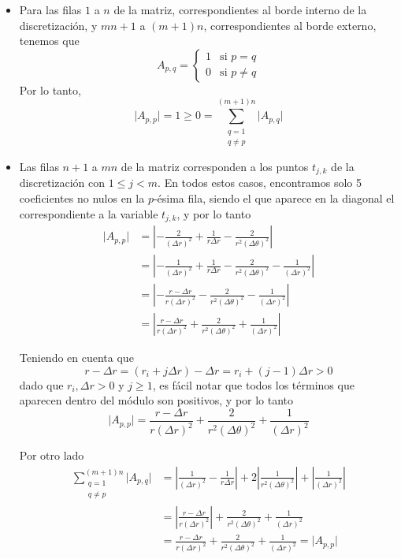 \documentclass[11pt, a4paper, spanish]{article}
\theoremstyle{plain}
\theoremstyle{remark}
\begin{document}
      \begin{itemize}

        \item Para las filas $1$ a $n$ de la matriz, correspondientes al borde interno de la discretización, y $mn + 1 $ a $(m+1)n$, correspondientes al borde externo, tenemos que
          \[ A_{p,q} = \begin{cases}
            1 & \text{si $p = q$} \\
            0 & \text{si $p \neq q$}
          \end{cases} \]
        Por lo tanto,
          \[ \vert A_{p,p} \vert = 1 \geq 0 = \sum_{\substack{q=1 \\ q \neq p}}^{(m+1)n} \vert A_{p,q} \vert \]

        \item Las filas $n + 1$ a $mn$ de la matriz corresponden a los puntos $t_{j,k}$ de la discretización con $1 \leq j < m$. En todos estos casos, encontramos solo 5 coeficientes no nulos en la $p$-ésima fila, siendo el que aparece en la diagonal el correspondiente a la variable $t_{j,k}$, y por lo tanto
          \[ \begin{split}
            \vert A_{p,p} \vert &= \left \vert - \frac{2}{(\Delta r)^2} + \frac{1}{r \Delta r} - \frac{2}{r^2 (\Delta \theta)^2} \right \vert \\
            &= \left \vert - \frac{1}{(\Delta r)^2} + \frac{1}{r \Delta r} - \frac{2}{r^2 (\Delta \theta)^2} - \frac{1}{(\Delta r)^2} \right \vert \\
            &= \left \vert - \frac{r - \Delta r}{r (\Delta r)^2} - \frac{2}{r^2 (\Delta \theta)^2} - \frac{1}{(\Delta r)^2} \right \vert \\
            &= \left \vert \frac{r - \Delta r}{r (\Delta r)^2} + \frac{2}{r^2 (\Delta \theta)^2} + \frac{1}{(\Delta r)^2} \right \vert
          \end{split} \]

        Teniendo en cuenta que
          \[ r - \Delta r = (r_i + j \Delta r) - \Delta r = r_i + (j - 1) \Delta r > 0\]
        dado que $r_i, \Delta r > 0$ y $j \geq 1$, es fácil notar que todos los términos que aparecen dentro del módulo son positivos, y por lo tanto
          \[ \vert A_{p,p} \vert = \frac{r - \Delta r}{r (\Delta r)^2} + \frac{2}{r^2 (\Delta \theta)^2} + \frac{1}{(\Delta r)^2} \]

        Por otro lado
          \[ \begin{split}
            \sum_{\substack{q=1 \\ q \neq p}}^{(m+1)n} \vert A_{p,q} \vert &= \left \vert \frac{1}{(\Delta r)^2} - \frac{1}{r \Delta r} \right \vert + 2 \left \vert \frac{1}{r^2 (\Delta \theta)^2} \right \vert + \left \vert \frac{1}{(\Delta r)^2} \right \vert \\
            &= \left \vert \frac{r - \Delta r}{r (\Delta r)^2} \right \vert + \frac{2}{r^2 (\Delta \theta)^2} + \frac{1}{(\Delta r)^2} \\
            &= \frac{r - \Delta r}{r (\Delta r)^2} + \frac{2}{r^2 (\Delta \theta)^2} + \frac{1}{(\Delta r)^2} = \vert A_{p,p} \vert
          \end{split} \]

      \end{itemize}
\end{document}

